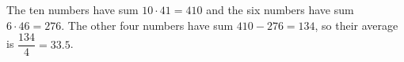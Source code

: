 The ten numbers have sum $10\cdot41=410$ and the six numbers have sum $6\cdot46=276$. The other four numbers have sum $410-276=134$, so their average is $\dfrac{134}{4}=\boxed{33.5}$.
